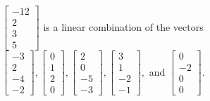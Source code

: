 \begin{exercise}
\begin{exerciseStatement}
  \end{exerciseStatement}
  \begin{exerciseAnswer}
   \(\left[\begin{array}{c}
-12 \\
2 \\
3 \\
5
\end{array}\right]\) 
  	 is  
	a linear combination of the vectors \(\left[\begin{array}{c}
-3 \\
2 \\
-4 \\
-2
\end{array}\right] , \left[\begin{array}{c}
0 \\
1 \\
2 \\
0
\end{array}\right] , \left[\begin{array}{c}
2 \\
0 \\
-5 \\
-3
\end{array}\right] , \left[\begin{array}{c}
3 \\
1 \\
-2 \\
-1
\end{array}\right] , \text{ and } \left[\begin{array}{c}
0 \\
-2 \\
0 \\
0
\end{array}\right]\).

	
  


  \end{exerciseAnswer}
\end{exercise}